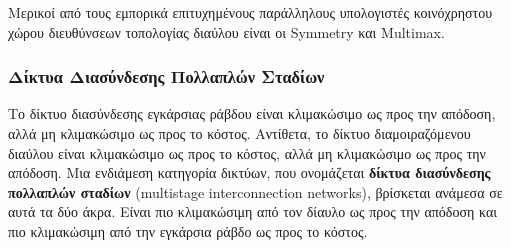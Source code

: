 \documentclass[12pt,a4paper]{article} %
\begin{document}
{\sloppy
Μερικοί από τους εμπορικά επιτυχημένους παράλληλους υπολογιστές 
κοινόχρηστου χώρου διευθύνσεων τοπολογίας διαύλου είναι οι 
Symmetry} και 
Multimax.
\par


\subsubsection{Δίκτυα Διασύνδεσης Πολλαπλών Σταδίων}
Το δίκτυο διασύνδεσης εγκάρσιας ράβδου είναι κλιμακώσιμο ως προς την 
απόδοση, αλλά μη κλιμακώσιμο ως προς το κόστος. Αντίθετα, το δίκτυο 
διαμοιραζόμενου διαύλου είναι 
κλιμακώσιμο ως προς το κόστος, αλλά μη κλιμακώσιμο ως προς την απόδοση. 
Μια ενδιάμεση κατηγορία δικτύων, που ονομάζεται \textbf{δίκτυα διασύνδεσης 
πολλαπλών σταδίων} (multistage interconnection 
networks), βρίσκεται ανάμεσα σε αυτά τα δύο άκρα. Είναι πιο κλιμακώσιμη 
από τον δίαυλο ως προς την απόδοση και πιο κλιμακώσιμη από την εγκάρσια 
ράβδο ως προς το κόστος.
\end{document}

